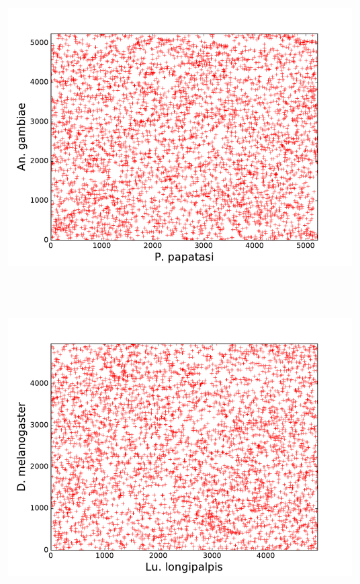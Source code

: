 \begin{figure}[H]
\begin{subfigure}[b]{0.4\textwidth}
    \includegraphics[width=\textwidth]{figures/synteny/papatasi_anopheles_plot}
    \caption{\label{fig:synteny-dotplots-papatasi-anopheles}}
  \end{subfigure}
  ~
  \begin{subfigure}[b]{0.4\textwidth}
    \includegraphics[width=\textwidth]{figures/synteny/longipalpis_dmel_plot}
    \caption{\label{fig:synteny-dotplots-longipalpis-dmel}}
  \end{subfigure}
  ~
  \begin{subfigure}[b]{0.4\textwidth}

\end{subfigure}
\end{figure}

